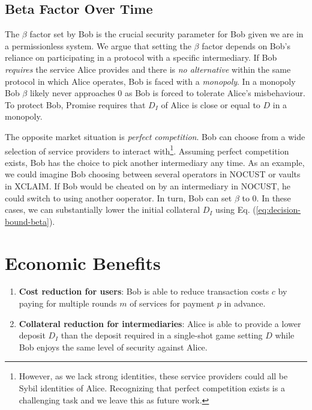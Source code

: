\documentclass[runningheads]{llncs}
\newcommand{\sys}{Promise\xspace}
\begin{document}
\subsection{Beta Factor Over Time}
The $\beta$ factor set by Bob is the crucial security parameter for Bob given we are in a permissionless system.
We argue that setting the $\beta$ factor depends on Bob's reliance on participating in a protocol with a specific intermediary.
If Bob \emph{requires} the service Alice provides and there is \emph{no alternative} within the same protocol in which Alice operates, Bob is faced with a \emph{monopoly}.
In a monopoly Bob $\beta$ likely never approaches 0 as Bob is forced to tolerate Alice's misbehaviour.
To protect Bob, \sys requires that $D_I$ of Alice is close or equal to $D$ in a monopoly.

The opposite market situation is \emph{perfect competition}.
Bob can choose from a wide selection of service providers to interact with\footnote{
However, as we lack strong identities, these service providers could all be Sybil identities of Alice.
Recognizing that perfect competition exists is a challenging task and we leave this as future work.}.
Assuming perfect competition exists, Bob has the choice to pick another intermediary any time.
As an example, we could imagine Bob choosing between several operators in NOCUST or vaults in XCLAIM.
If Bob would be cheated on by an intermediary in NOCUST, he could switch to using another ooperator.
In turn, Bob can set $\beta$ to 0.
In these cases, we can substantially lower the initial collateral $D_I$ using Eq. (\ref{eq:decision-bound-beta}).
\section{Economic Benefits}
\label{sec:benefits}

\begin{enumerate}
    \item \textbf{Cost reduction for users}: Bob is able to reduce transaction costs $c$ by paying for multiple rounds $m$ of services for payment $p$ in advance.
    \item \textbf{Collateral reduction for intermediaries}: Alice is able to provide a lower deposit $D_I$ than the deposit required in a single-shot game setting $D$ while Bob enjoys the same level of security against Alice.
\end{enumerate}
\end{document}
